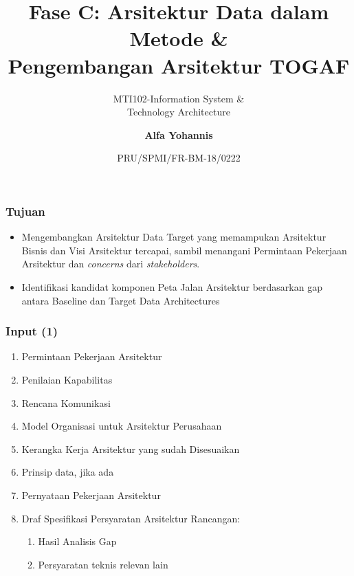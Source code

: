 \documentclass[aspectratio=169, table]{beamer}
\subtitle{MTI102-Information System \&\\Technology Architecture}
\title{Fase C: Arsitektur Data dalam Metode \&\\ Pengembangan Arsitektur TOGAF}
\date[Serial]{\scriptsize {PRU/SPMI/FR-BM-18/0222}}
\author[Pradita]{\small {\textbf{Alfa Yohannis}}}
\begin{document}
	\frame{\titlepage}

	\begin{frame}
		\frametitle{Tujuan}
		\begin{itemize}
			\item Mengembangkan Arsitektur Data Target yang memampukan Arsitektur Bisnis dan Visi Arsitektur tercapai, sambil menangani Permintaan Pekerjaan Arsitektur dan \textit{concerns} dari \textit{stakeholders}.
			\item Identifikasi kandidat komponen Peta Jalan Arsitektur berdasarkan gap antara Baseline dan Target Data Architectures
		\end{itemize}
	\end{frame}

	\begin{frame}
		\frametitle{Input (1)}
			\vspace{20pt}
					\begin{enumerate}
						\item Permintaan Pekerjaan Arsitektur
						\item Penilaian Kapabilitas
						\item Rencana Komunikasi
						\item Model Organisasi untuk Arsitektur Perusahaan
						\item Kerangka Kerja Arsitektur yang sudah Disesuaikan
						\item Prinsip data, jika ada
						\item Pernyataan Pekerjaan Arsitektur
						\item Draf Spesifikasi Persyaratan Arsitektur Rancangan:
						\begin{enumerate}
							\item Hasil Analisis Gap
							\item Persyaratan teknis relevan lain
						\end{enumerate}
					\end{enumerate}
	\end{frame}
\end{document}
